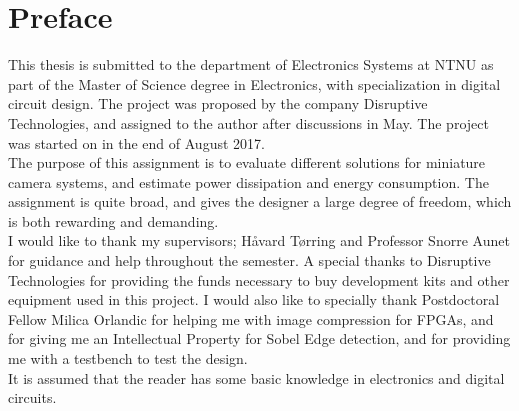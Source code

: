 \newpage
\chapter*{Preface}




This thesis is submitted to the department of Electronics Systems at NTNU as part of the Master of Science degree in Electronics, with specialization in digital circuit design. The project was proposed by the company Disruptive Technologies, and assigned to the author after discussions in May. The project was started on in the end of August 2017. 
\\

The purpose of this assignment is to evaluate different solutions for miniature camera systems, and estimate power dissipation and energy consumption. The assignment is quite broad, and gives the designer a large degree of freedom, which is both rewarding and demanding. 
\\

I would like to thank my supervisors; Håvard Tørring and Professor Snorre Aunet for guidance and help throughout the semester. A special thanks to Disruptive Technologies for providing the funds necessary to buy development kits and other equipment used in this project. I would also like to specially thank Postdoctoral Fellow Milica Orlandic for helping me with image compression for FPGAs, and for giving me an Intellectual Property for Sobel Edge detection, and for providing me with a testbench to test the design. \\

It is assumed that the reader has some basic knowledge in electronics and digital circuits.